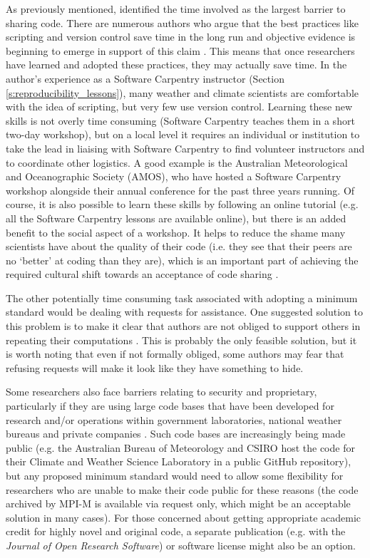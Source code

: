 As previously mentioned, \citet{Stodden2010} identified the time involved as the largest barrier to sharing code. There are numerous authors who argue that the best practices like scripting and version control save time in the long run \citep[e.g.][]{Sandve2013,Wilson2014a} and objective evidence is beginning to emerge in support of this claim \citep{Simperler2015}. This means that once researchers have learned and adopted these practices, they may actually save time. In the author's experience as a Software Carpentry instructor (Section \ref{s:reproducibility_lessons}), many weather and climate scientists are comfortable with the idea of scripting, but very few use version control. Learning these new skills is not overly time consuming (Software Carpentry teaches them in a short two-day workshop), but on a local level it requires an individual or institution to take the lead in liaising with Software Carpentry to find volunteer instructors and to coordinate other logistics. A good example is the Australian Meteorological and Oceanographic Society (AMOS), who have hosted a Software Carpentry workshop alongside their annual conference for the past three years running. Of course, it is also possible to learn these skills by following an online tutorial (e.g. all the Software Carpentry lessons are available online), but there is an added benefit to the social aspect of a workshop. It helps to reduce the shame many scientists have about the quality of their code (i.e. they see that their peers are no `better' at coding than they are), which is an important part of achieving the required cultural shift towards an acceptance of code sharing \citep{Barnes2010}.

The other potentially time consuming task associated with adopting a minimum standard would be dealing with requests for assistance. One suggested solution to this problem is to make it clear that authors are not obliged to support others in repeating their computations \citep{Easterbrook2014}. This is probably the only feasible solution, but it is worth noting that even if not formally obliged, some authors may fear that refusing requests will make it look like they have something to hide. 

Some researchers also face barriers relating to security and proprietary, particularly if they are using large code bases that have been developed for research and/or operations within government laboratories, national weather bureaus and private companies \citep{Stodden2010}. Such code bases are increasingly being made public (e.g. the Australian Bureau of Meteorology and CSIRO host the code for their Climate and Weather Science Laboratory in a public GitHub repository), but any proposed minimum standard would need to allow some flexibility for researchers who are unable to make their code public for these reasons (the code archived by MPI-M is available via request only, which might be an acceptable solution in many cases). For those concerned about getting appropriate academic credit for highly novel and original code, a separate publication (e.g. with the \textit{Journal of Open Research Software}) or software license \citep[e.g.][]{Morin2012} might also be an option.

